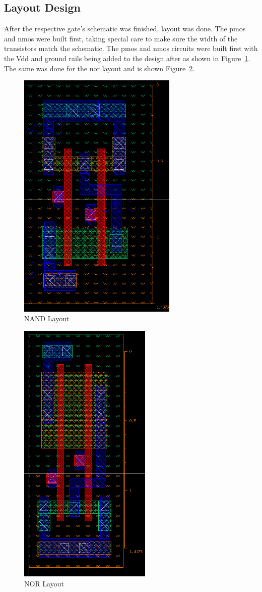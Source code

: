 \documentclass[12pt]{article}
\begin{document}
\subsection{Layout Design}
After the respective gate's schematic was finished, layout was done. The pmos and nmos were built first, taking special care to make sure the width of the
transistors match the schematic. The pmos and nmos circuits were built first with the Vdd and ground rails being added to the design after as shown in Figure~\ref{fig:nand_layout}.
The same was done for the nor layout and is shown Figure~\ref{fig:nor_layout}.
\begin{figure}[!htb]
  \centering
  \includegraphics[width=3in,angle=90]{figures/nand/nand_layout.png}
  \caption{NAND Layout}\label{fig:nand_layout}
\end{figure}
\begin{figure}[!htb]
  \centering
  \includegraphics[width=2.5in,angle=90]{figures/nor/nor_layout.png}
  \caption{NOR Layout}\label{fig:nor_layout}
\end{figure}
\end{document}
